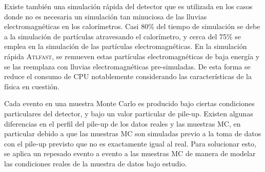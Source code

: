 Existe también una simulación rápida del detector que es utilizada en los casos
donde no es necesaria un simulación tan minuciosa de las lluvias
electromagnéticas en los calorímetros. Casi 80\% del tiempo de simulación se
debe a la simulación de partículas atravesando el calorímetro, y cerca del 75\%
se emplea en la simulación de las partículas electromagnéticas. En la simulación
rápida \textsc{Atlfast}\cite{Richter-Was:683751}, se remueven estas partículas
electromagnéticas de baja energía y se las reemplaza con lluvias
electromagnéticas pre-simuladas. De esta forma se reduce el consumo de CPU
notablemente considerando las características de la física en cuestión.


Cada evento en una muestra Monte Carlo es producido bajo ciertas condiciones
particulares del detector, y bajo un valor particular de pile-up. Existen
algunas diferencias en el perfil del pile-up de los datos reales y las muestras
MC, en particular debido a que las muestras MC son simuladas previo a la toma de
datos con el pile-up previsto que no es exactamente igual al real. Para
solucionar esto, se aplica un repesado evento a evento a las muestras MC de
manera de modelar las condiciones reales de la muestra de datos bajo estudio.

